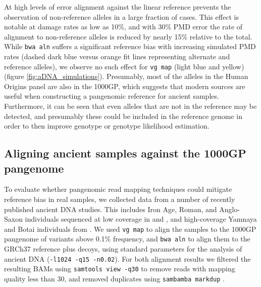 At high levels of error alignment against the linear reference prevents the observation of non-reference alleles in a large fraction of cases.
This effect is notable at damage rates as low as 10\%, and with 30\% PMD error the rate of alignment to non-reference alleles is reduced by nearly 15\% relative to the total.
While {\tt bwa aln} suffers a significant reference bias with increasing simulated PMD rates (dashed dark blue versus orange fit lines representing alternate and reference alleles), we observe no such effect for {\tt vg map} (light blue and yellow) (figure \ref{fig:aDNA_simulations}).
Presumably, most of the alleles in the Human Origins panel are also in the 1000GP, which suggests that modern sources are useful when constructing a pangenomic reference for ancient samples.
Furthermore, it can be seen that even alleles that are not in the reference may be detected, and presumably these could be included in the reference genome in order to then improve genotype or genotype likelihood estimation.

\subsection{Aligning ancient samples against the 1000GP pangenome}

To evaluate whether pangenomic read mapping techniques could mitigate reference bias in real samples, we collected data from a number of recently published ancient DNA studies.
This includes Iron Age, Roman, and Anglo-Saxon individuals sequenced at low coverage in \cite{schiffels2016iron} and \cite{martiniano2016genomic}, and high-coverage Yamnaya and Botai individuals from \cite{de2018first}.
We used {\tt vg map} to align the samples to the 1000GP pangenome of variants above 0.1\% frequency, and {\tt bwa aln} to align them to the GRCh37 reference plus decoys, using standard parameters for the analysis of ancient DNA ({\tt -l1024 -q15 -n0.02}).
For both alignment results we filtered the resulting BAMs using {\tt samtools view -q30} to remove reads with mapping quality less than 30, and removed duplicates using {\tt sambamba markdup} \cite{tarasov2015sambamba}.

